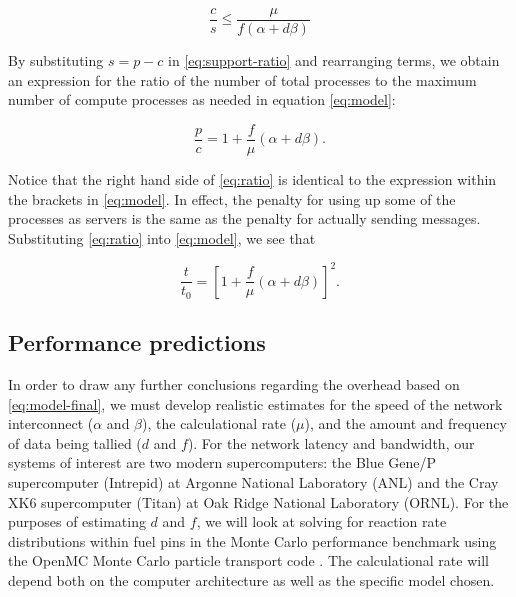 \documentclass[3p]{elsarticle}
\begin{document}
\begin{equation}
  \label{eq:support-ratio}
  \frac{c}{s} \le \frac{\mu}{f \left ( \alpha + d\beta \right )}
\end{equation}

\noindent By substituting $s = p - c$ in \eqref{eq:support-ratio} and
rearranging terms, we obtain an expression for the ratio of the number of total
processes to the maximum number of compute processes as needed in equation
\eqref{eq:model}:

\begin{equation}
  \label{eq:ratio}
  \frac{p}{c} = 1 + \frac{f}{\mu} \left ( \alpha + d \beta \right ).
\end{equation}

\noindent Notice that the right hand side of \eqref{eq:ratio} is identical to
the expression within the brackets in \eqref{eq:model}. In effect, the penalty
for using up some of the processes as servers is the same as the penalty for
actually sending messages. Substituting \eqref{eq:ratio} into \eqref{eq:model},
we see that

\begin{equation}
  \label{eq:model-final}
  \frac{t}{t_0} = \left [ 1 + \frac{f}{\mu} \left ( \alpha + d\beta
    \right ) \right ]^2.
\end{equation}

\subsection{Performance predictions}

In order to draw any further conclusions regarding the overhead based on
\eqref{eq:model-final}, we must develop realistic estimates for the speed of the
network interconnect ($\alpha$ and $\beta$), the calculational rate ($\mu$), and
the amount and frequency of data being tallied ($d$ and $f$). For the network
latency and bandwidth, our systems of interest are two modern supercomputers:
the Blue Gene/P supercomputer (Intrepid) at Argonne National Laboratory (ANL)
and the Cray XK6 supercomputer (Titan) at Oak Ridge National Laboratory
(ORNL). For the purposes of estimating $d$ and $f$, we will look at solving for
reaction rate distributions within fuel pins in the Monte Carlo performance
benchmark \cite{mc11-hoogenboom} using the OpenMC Monte Carlo particle transport
code \cite{ane-romano-2012}. The calculational rate will depend both on the
computer architecture as well as the specific model chosen.
\end{document}
